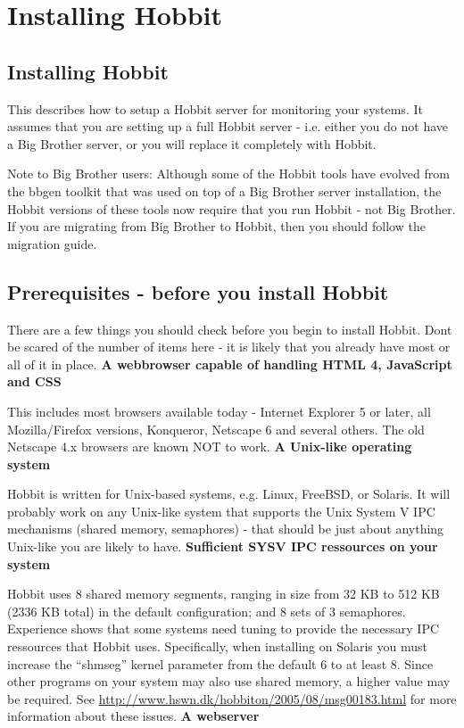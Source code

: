 \chapter{Installing Hobbit}
\label{chap:Installing hobbit}

\section{Installing Hobbit}


 This describes how to setup a Hobbit server for monitoring your systems. It assumes that you are setting up a full Hobbit server - i.e. either you do not have a Big Brother server, or you will replace it completely with Hobbit.


 Note to Big Brother users: Although some of the Hobbit tools have evolved from the bbgen toolkit that was used on top of a Big Brother server installation, the Hobbit versions of these tools now require that you run Hobbit - not Big Brother. If you are migrating from Big Brother to Hobbit, then you should follow the migration guide.

\section{Prerequisites - before you install Hobbit}


 There are a few things you should check before you begin to install Hobbit. Dont be scared of the number of items here - it is likely that you already have most or all of it in place.
\textbf{A webbrowser capable of handling HTML 4, JavaScript and CSS}


 This includes most browsers available today - Internet Explorer 5 or later, all Mozilla/Firefox versions, Konqueror, Netscape 6 and several others. The old Netscape 4.x browsers are known NOT to work.
\textbf{A Unix-like operating system}


 Hobbit is written for Unix-based systems, e.g. Linux, FreeBSD, or Solaris. It will probably work on any Unix-like system that supports the Unix System V IPC mechanisms (shared memory, semaphores) - that should be just about anything Unix-like you are likely to have.
\textbf{Sufficient SYSV IPC ressources on your system}


 Hobbit uses 8 shared memory segments, ranging in size from 32 KB to 512 KB (2336 KB total) in the default configuration; and 8 sets of 3 semaphores. Experience shows that some systems need tuning to provide the necessary IPC ressources that Hobbit uses. Specifically, when installing on Solaris you must increase the ``shmseg'' kernel parameter from the default 6 to at least 8. Since other programs on your system may also use shared memory, a higher value may be required. See \url{http://www.hswn.dk/hobbiton/2005/08/msg00183.html} for more information about these issues.
\textbf{A webserver}


